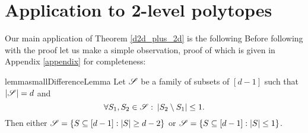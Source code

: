 \section{Application to \textbf{2}-level polytopes} \label{sec2level}
Our main application of Theorem \ref{d2d_plus_2d} is the following
\twoLevelNew*
\noindent Before following with the proof let us make a simple observation, proof of which is given in Appendix \ref{appendix} for completeness:
\begin{restatable}[]{lemma}{smallDifferenceLemma}\label{smallDifferenceLemma}
    Let ${\mathscr{S}}$ be a family of subsets of $[d-1]$ such that $|{\mathscr{S}}| = d$ and 
    \[
        \forall S_1, S_2 \in {\mathscr{S}}:\:|S_2\setminus S_1|\leq 1.
    \]
    Then either ${\mathscr{S}} = \{S\subseteq[d-1]: |S| \geq d-2\}$ or ${\mathscr{S}} = \{S\subseteq[d-1]: |S| \leq 1\}$.
\end{restatable}
